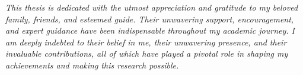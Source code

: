 \thispagestyle{empty}
\vspace*{0.28\textheight}
\begin{center}
\textit{This thesis is dedicated with the utmost appreciation and gratitude
to my beloved family, friends, and esteemed guide. Their
unwavering support, encouragement, and expert guidance have
been indispensable throughout my academic journey. I am deeply
indebted to their belief in me, their unwavering presence, and their
invaluable contributions, all of which have played a pivotal role in
shaping my achievements and making this research possible.}
\end{center}
\clearpage
